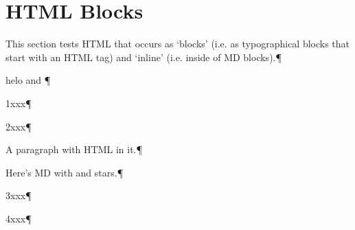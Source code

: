 

\section{HTML Blocks
}
This section tests HTML that occurs as ‘blocks’ (i.e. as typographical blocks
that start with an HTML tag) and ‘inline’ (i.e. inside of MD blocks).¶\par
helo  and ¶\par
1xxx¶\par
2xxx¶\par
A paragraph with  HTML in it.¶\par
Here’s MD with  and  stars.¶\par
3xxx¶\par
4xxx¶\par
